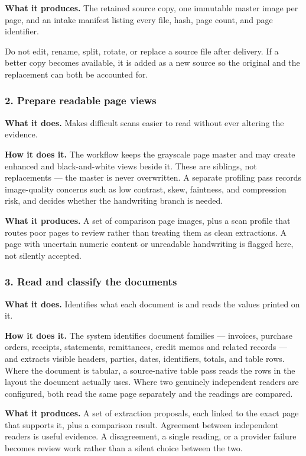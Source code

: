 \documentclass[
]{article}
\begin{document}
\textbf{What it produces.} The retained source copy, one immutable
master image per page, and an intake manifest listing every file, hash,
page count, and page identifier.

Do not edit, rename, split, rotate, or replace a source file after
delivery. If a better copy becomes available, it is added as a new
source so the original and the replacement can both be accounted for.

\subsubsection{2. Prepare readable page
views}\label{prepare-readable-page-views}

\textbf{What it does.} Makes difficult scans easier to read without ever
altering the evidence.

\textbf{How it does it.} The workflow keeps the grayscale page master
and may create enhanced and black-and-white views beside it. These are
siblings, not replacements --- the master is never overwritten. A
separate profiling pass records image-quality concerns such as low
contrast, skew, faintness, and compression risk, and decides whether the
handwriting branch is needed.

\textbf{What it produces.} A set of comparison page images, plus a scan
profile that routes poor pages to review rather than treating them as
clean extractions. A page with uncertain numeric content or unreadable
handwriting is flagged here, not silently accepted.

\subsubsection{3. Read and classify the
documents}\label{read-and-classify-the-documents}

\textbf{What it does.} Identifies what each document is and reads the
values printed on it.

\textbf{How it does it.} The system identifies document families ---
invoices, purchase orders, receipts, statements, remittances, credit
memos and related records --- and extracts visible headers, parties,
dates, identifiers, totals, and table rows. Where the document is
tabular, a source-native table pass reads the rows in the layout the
document actually uses. Where two genuinely independent readers are
configured, both read the same page separately and the readings are
compared.

\textbf{What it produces.} A set of extraction proposals, each linked to
the exact page that supports it, plus a comparison result. Agreement
between independent readers is useful evidence. A disagreement, a single
reading, or a provider failure becomes review work rather than a silent
choice between the two.
\end{document}
